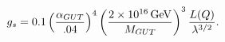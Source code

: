 \begin{equation} \label{standval}
g_{s}=0.1\left({\alpha_{GUT}\over .04}\right)^4
\left({2\times 10^{16}\,{\rm GeV}\over M_{GUT}}\right)^3
{L(Q)\over \lambda^{3/2}}.
\end{equation}

